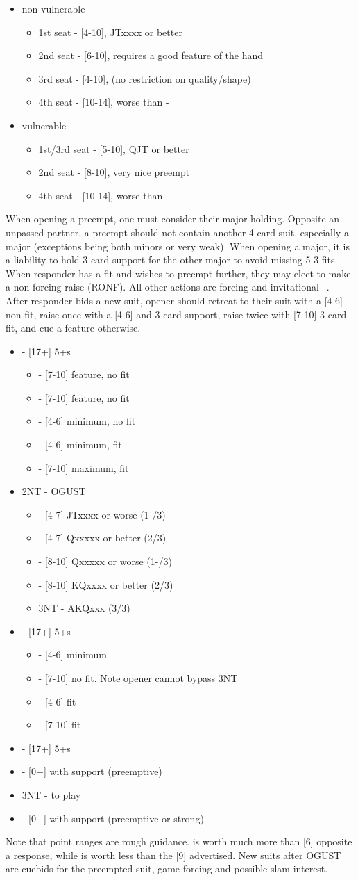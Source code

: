 \documentclass[12pt]{report}
\newcommand{\n}{\\}
\newcommand{\q}[1]{\multido{}{#1}{\qquad}}
\newcommand{\ul}[1]{\begin{itemize}#1\end{itemize}}
\newcommand{\li}[1]{\item[~] \q{#1}}
\begin{document}
    \ul {
        \li0 non-vulnerable
        \ul {
            \li0 1st seat - [4-10], JTxxxx or better
            \li0 2nd seat - [6-10], requires a good feature of the hand
            \li0 3rd seat - [4-10], (no restriction on quality/shape)
            \li0 4th seat - [10-14], worse than \di1-\di2
        }
        \li0 vulnerable
        \ul {
            \li0 1st/3rd seat - [5-10], QJT or better
            \li0 2nd seat - [8-10], very nice preempt
            \li0 4th seat - [10-14], worse than \di1-\di2
        }
    }

    When opening a preempt, one must consider their major holding.  Opposite an unpassed partner, a preempt should not contain another 4-card suit, especially a major (exceptions being both minors or very weak).  When opening a major, it is a liability to hold 3-card support for the other major to avoid missing 5-3 fits.  When responder has a fit and wishes to preempt further, they may elect to make a non-forcing raise (RONF).  All other actions are forcing and invitational+.\n
    
    After responder bids a new suit, opener should retreat to their suit with a [4-6] non-fit, raise once with a [4-6] and 3-card support, raise twice with [7-10] 3-card fit, and cue a feature otherwise.

    \ul {
        \li0  - [17+] 5+\sp{}s
        \ul {
            \li0 \cl3 - [7-10] feature, no fit
            \li0 \di3 - [7-10] feature, no fit
            \li0 \he3 - [4-6] minimum, no fit
            \li0 \sp3 - [4-6] minimum, fit
            \li0 \sp4 - [7-10] maximum, fit
        }
        \li0 2NT - OGUST
        \ul {
            \li0 \cl3 - [4-7] JTxxxx or worse (1-/3)
            \li0 \di3 - [4-7] Qxxxxx or better (2/3)
            \li0 \sp3 - [8-10] Qxxxxx or worse (1-/3)
            \li0 \sp3 - [8-10] KQxxxx or better (2/3)
            \li0 3NT - AKQxxx (3/3)
        }
        \li0 \cl3 - [17+] 5+\cl{}s
        \ul {
            \li0 \he3 - [4-6] minimum
            \li0 \sp3 - [7-10] no fit.  Note opener cannot bypass 3NT
            \li0 \cl4 - [4-6] fit
            \li0 \cl5 - [7-10] fit
        }
        \li0 \di3 - [17+] 5+\di{}s
        \li0 \he3 - [0+] with support (preemptive)
        \li0 3NT - to play
        \li0 \he4 - [0+] with support (preemptive or strong)
    }

    Note that point ranges are rough guidance.  is worth much more than [6] opposite a  response, while  is worth less than the [9] advertised.  New suits after OGUST are cuebids for the preempted suit, game-forcing and possible slam interest.
\end{document}

